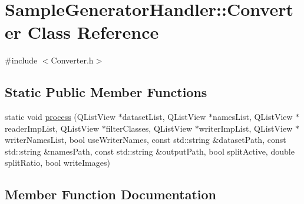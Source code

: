 \hypertarget{class_sample_generator_handler_1_1_converter}{}\section{Sample\+Generator\+Handler\+:\+:Converter Class Reference}
\label{class_sample_generator_handler_1_1_converter}


{\ttfamily \#include $<$Converter.\+h$>$}

\subsection*{Static Public Member Functions}
\begin{DoxyCompactItemize}
\item 
static void \hyperlink{class_sample_generator_handler_1_1_converter_aa81680abc717a733101b6cddd7aa69f7}{process} (Q\+List\+View $\ast$dataset\+List, Q\+List\+View $\ast$names\+List, Q\+List\+View $\ast$reader\+Imp\+List, Q\+List\+View $\ast$filter\+Classes, Q\+List\+View $\ast$writer\+Imp\+List, Q\+List\+View $\ast$writer\+Names\+List, bool use\+Writer\+Names, const std\+::string \&dataset\+Path, const std\+::string \&names\+Path, const std\+::string \&output\+Path, bool split\+Active, double split\+Ratio, bool write\+Images)
\end{DoxyCompactItemize}


\subsection{Member Function Documentation}
\mbox{\label{class_sample_generator_handler_1_1_converter_aa81680abc717a733101b6cddd7aa69f7}} 
